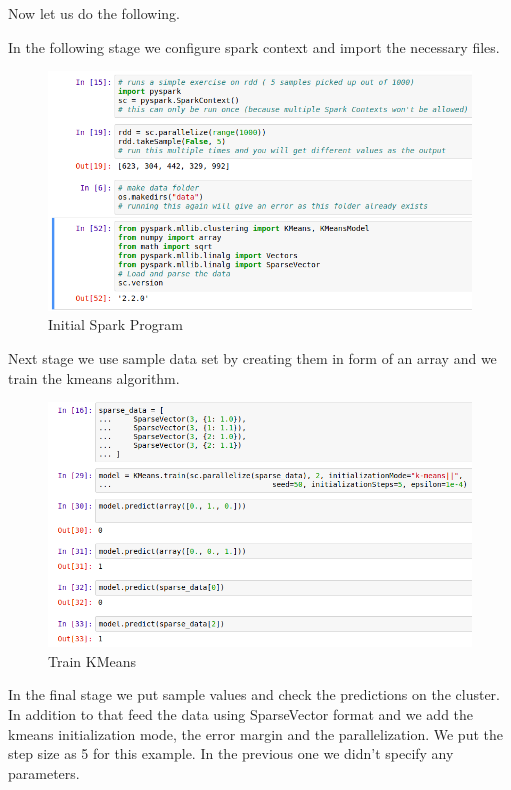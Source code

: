 Now let us do the following.

In the following stage we configure spark context and import the
necessary files.

\begin{figure}[htbp]
\centering
\includegraphics[width=1.0\textwidth]{images/docker-spark-tut-1.png}
\caption{Initial Spark Program}
\end{figure}

Next stage we use sample data set by creating them in form of an array
and we train the kmeans algorithm.

\begin{figure}[htbp]
\centering
\includegraphics[width=1.0\textwidth]{images/docker-spark-tut-4.png}
\caption{Train KMeans}
\end{figure}

In the final stage we put sample values and check the predictions on the
cluster. In addition to that feed the data using SparseVector format and
we add the kmeans initialization mode, the error margin and the
parallelization. We put the step size as 5 for this example. In the
previous one we didn't specify any parameters.

